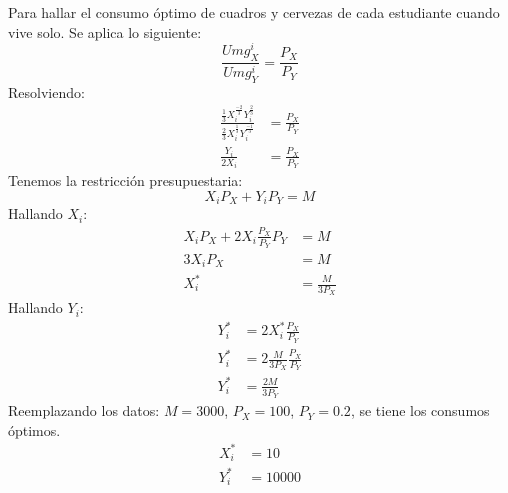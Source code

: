 Para hallar el consumo óptimo de cuadros y cervezas de cada estudiante cuando vive solo. Se aplica lo siguiente:
	$$\frac{Umg_{X}^{i}}{Umg_{Y}^{i}} = \frac{P_{X}}{P_{Y}}$$
Resolviendo:
	\begin{align*}
		\frac{\frac{1}{3}X^{\frac{-2}{3}}_{i}Y^{\frac{2}{3}}_{i} }{\frac{2}{3}X^{\frac{1}{3}}_{i}Y^{\frac{-1}{3}}_{i}} &= \frac{P_{X}}{P_{Y}}\\
		\frac{Y_{i}}{2X_{i}} &= \frac{P_{X}}{P_{Y}}
	\end{align*}
Tenemos la restricción presupuestaria:
	$$X_{i}P_{X} + Y_{i}P_{Y} = M$$
Hallando $X_{i}$:
	\begin{align*}
		X_{i}P_{X} + 2X_{i}\frac{P_{X}}{P_{Y}}P_{Y} &= M\\
		3X_{i}P_{X} &= M\\
		X_{i}^* &= \frac{M}{3P_{X}}
	\end{align*}
Hallando $Y_{i}$:    
	\begin{align*}
		Y^*_{i} &= 2X_{i}^*\frac{P_{X}}{P_{Y}}\\
		Y^*_{i} &= 2\frac{M}{3P_{X}}\frac{P_{X}}{P_{Y}}\\
		Y^*_{i} &= \frac{2M}{3P_{Y}}
	\end{align*}
Reemplazando los datos: $M=3000$, $P_{X}=100$, $P_{Y}=0.2$, se tiene los consumos óptimos.
	\begin{align*}
		X^*_{i} &= 10\\
		Y^*_{i} &= 10000
	\end{align*}